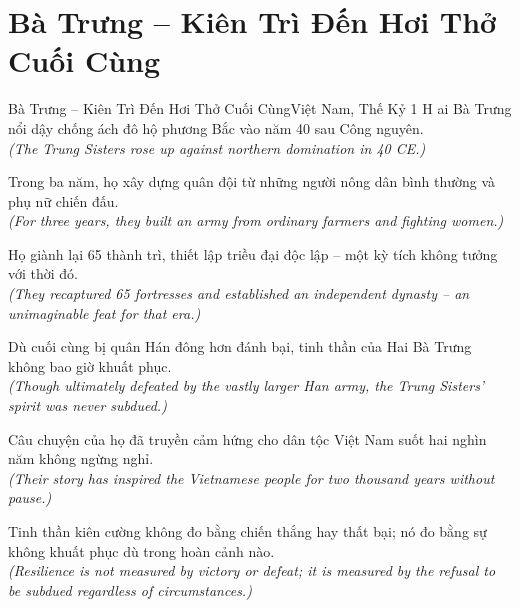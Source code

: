 \section{Bà Trưng -- Kiên Trì Đến Hơi Thở Cuối Cùng}
\begin{truyen}{Bà Trưng -- Kiên Trì Đến Hơi Thở Cuối Cùng}{Việt Nam, Thế Kỷ 1}
H ai Bà Trưng nổi dậy chống ách đô hộ phương Bắc vào năm 40 sau Công nguyên.\\
\textit{(The Trung Sisters rose up against northern domination in 40 CE.)}

Trong ba năm, họ xây dựng quân đội từ những người nông dân bình thường và phụ nữ chiến đấu.\\
\textit{(For three years, they built an army from ordinary farmers and fighting women.)}

Họ giành lại 65 thành trì, thiết lập triều đại độc lập -- một kỳ tích không tưởng với thời đó.\\
\textit{(They recaptured 65 fortresses and established an independent dynasty -- an unimaginable feat for that era.)}

Dù cuối cùng bị quân Hán đông hơn đánh bại, tinh thần của Hai Bà Trưng không bao giờ khuất phục.\\
\textit{(Though ultimately defeated by the vastly larger Han army, the Trung Sisters' spirit was never subdued.)}

Câu chuyện của họ đã truyền cảm hứng cho dân tộc Việt Nam suốt hai nghìn năm không ngừng nghỉ.\\
\textit{(Their story has inspired the Vietnamese people for two thousand years without pause.)}

\end{truyen}
\begin{baihoc}
  Tinh thần kiên cường không đo bằng chiến thắng hay thất bại; nó đo bằng sự không khuất phục dù trong hoàn cảnh nào.\\
  \textit{(Resilience is not measured by victory or defeat; it is measured by the refusal to be subdued regardless of circumstances.)}
\end{baihoc}
